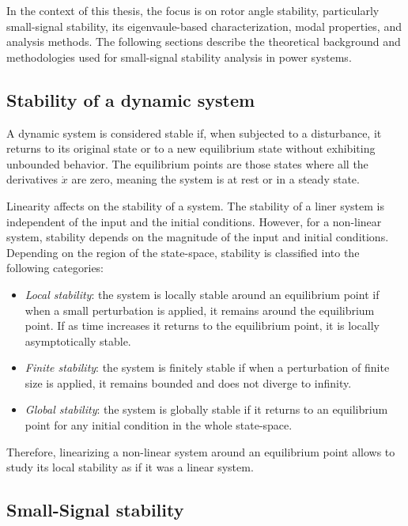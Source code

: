 In the context of this thesis, the focus is on rotor angle stability, particularly small-signal stability, its eigenvaule-based characterization, 
modal properties, and analysis methods. The following sections describe the theoretical background and methodologies used for small-signal stability 
analysis in power systems. 

\subsection{Stability of a dynamic system}

A dynamic system is considered stable if, when subjected to a disturbance, it returns to its original state or to a new equilibrium state without
exhibiting unbounded behavior. The equilibrium points are those states where all the derivatives $\dot{x}$ are zero, meaning the system is at rest
or in a steady state. 

Linearity affects on the stability of a system. The stability of a liner system is independent of the input and the initial conditions.
However, for a non-linear system, stability depends on the magnitude of the input and initial conditions. Depending on the region of the state-space,
stability is classified into the following categories:

\begin{itemize}
  \item \textit{Local stability}: the system is locally stable around an equilibrium point if when a small perturbation is applied,
  it remains around the equilibrium point. If as time increases it returns to the equilibrium point, it is locally asymptotically stable\cite{StabilityAndControlKundur}.
  \item \textit{Finite stability}: the system is finitely stable if when a perturbation of finite size is applied, it remains bounded and does not diverge to infinity.
  \item \textit{Global stability}: the system is globally stable if it returns to an equilibrium point for any initial condition in the whole state-space.
\end{itemize}

Therefore, linearizing a non-linear system around an equilibrium point allows to study its local stability as if it was a linear system. 

\subsection{Small-Signal stability}

